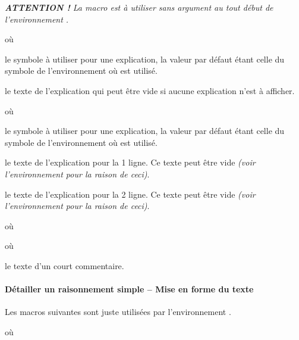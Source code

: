 \documentclass[12pt,a4paper]{article}
\begin{document}
\separation


\emph{\textbf{ATTENTION !} La macro  est à utiliser sans argument au tout début de l'environnement .}

\extraspace

\extraspace

 où \quad {}

\IDoption{} le symbole à utiliser pour une explication, la valeur par défaut étant celle du symbole de l'environnement  où  est utilisé.

\IDarg{} le texte de l'explication qui peut être vide si aucune explication n'est à afficher.


\separation


 où \quad {}

\IDoption{} le symbole à utiliser pour une explication, la valeur par défaut étant celle du symbole de l'environnement  où  est utilisé.

 le texte de l'explication pour la 1\iere{} ligne.
          Ce texte peut être vide \emph{(voir l'environnement  pour la raison de ceci)}.

 le texte de l'explication pour la 2\ieme{} ligne.
          Ce texte peut être vide \emph{(voir l'environnement  pour la raison de ceci)}.


\separation


 où \quad {}

 où \quad {}


\IDarg{} le texte d'un court commentaire.




\paragraph{Détailler un raisonnement simple -- Mise en forme du texte}

Les macros suivantes sont juste utilisées par l'environnement .


\separation




\separation


 où \quad {}
\end{document}
